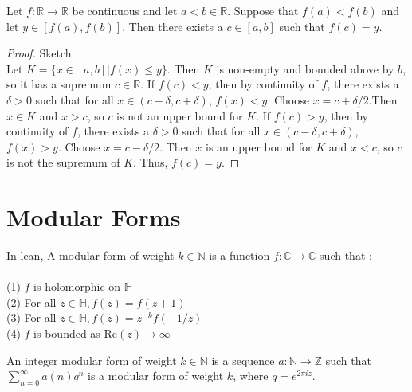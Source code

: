 \begin{theorem}
  \label{thm:intermediate_value}
  \leanok

  Let $f : \mathbb{R} → \mathbb{R}$ be continuous and let $a < b ∈ \mathbb{R}$.
  Suppose that $f(a) < f(b)$ and let $y \in [f(a), f(b)]$.
  Then there exists a $c ∈ [a, b]$ such that $f(c) = y$.
\end{theorem}

\begin{proof}
  \leanok
  Sketch: \\
  Let $K = \{x \in [a, b] | f(x) \le y\}$.
  Then $K$ is non-empty and bounded above by $b$, so it has a supremum $c \in \mathbb{R}$.
  If $f(c) < y$, then by continuity of $f$, there exists a $\delta > 0$ such that for all $x ∈ (c - \delta, c + \delta)$, $f(x) < y$.
  Choose $x = c + \delta/2$.Then $x ∈ K$ and $x > c$, so $c$ is not an upper bound for $K$.
  If $f(c) > y$, then by continuity of $f$, there exists a $\delta > 0$ such that for all $x ∈ (c - \delta, c + \delta)$, $f(x) > y$.
  Choose $x = c - \delta/2$. Then $x$ is an upper bound for $K$ and $x < c$, so $c$ is not the supremum of $K$.
  Thus, $f(c) = y$.

\end{proof}

\section{Modular Forms}

\begin{definition} 
  \label{def:ModularForm}
  \leanok
  In lean, A modular form of weight $k \in \mathbb{N}$ is a function $f : \mathbb{C} → \mathbb{C}$ such that : \\ \\
  (1) $f$ is holomorphic on $\mathbb{H}$ \\
  (2) For all $z \in \mathbb{H}, f(z) = f(z + 1)$ \\
  (3) For all $z \in \mathbb{H}, f(z) = z^{-k} f(-1/z)$ \\
  (4) $f$ is bounded as Re$(z) \to \infty$ \\
\end{definition}

\begin{definition} 
  \label{def: IntegerModularForm}
  \leanok
  An integer modular form of weight $k \in \mathbb{N}$ is a sequence $a : \mathbb{N} → \mathbb{Z}$
  such that $\sum_{n=0}^{\infty} a(n) q^n$ is a modular form of weight $k$, where $q = e ^ {2 \pi i z}.$
\end{definition}